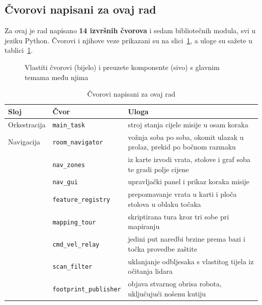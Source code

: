 \documentclass[12pt,a4paper]{article}
\begin{document}
\subsection{Čvorovi napisani za ovaj rad}

Za ovaj je rad napisano \textbf{14 izvršnih čvorova} i sedam bibliotečnih modula, svi u jeziku
Python. Čvorovi i njihove veze prikazani su na slici~\ref{fig:graf}, a uloge su sažete u
tablici~\ref{tab:cvorovi}.

\begin{figure}[!htbp]
    \centering
    \resizebox{0.92\textwidth}{!}{}
    \caption{Vlastiti čvorovi (bijelo) i preuzete komponente (sivo) s glavnim temama među njima}
    \label{fig:graf}
\end{figure}

\begin{table}[!htbp]
    \centering
    \caption{Čvorovi napisani za ovaj rad}
    \label{tab:cvorovi}
    \scriptsize
    \begin{tabularx}{\textwidth}{@{}l l X@{}}
        \toprule
        \textbf{Sloj} & \textbf{Čvor} & \textbf{Uloga} \\
        \midrule
        Orkestracija & \texttt{main\_task}           & stroj stanja cijele misije u osam koraka \\
        \midrule
        Navigacija   & \texttt{room\_navigator}      & vožnja soba po soba, okomit ulazak u prolaz, prekid po bočnom razmaku \\
                     & \texttt{nav\_zones}           & iz karte izvodi vrata, stolove i graf soba te gradi polje cijene \\
                     & \texttt{nav\_gui}             & upravljački panel i prikaz koraka misije \\
                     & \texttt{feature\_registry}    & prepoznavanje vrata u karti i ploča stolova u oblaku točaka \\
                     & \texttt{mapping\_tour}        & skriptirana tura kroz tri sobe pri mapiranju \\
                     & \texttt{cmd\_vel\_relay}      & jedini put naredbi brzine prema bazi i točka provedbe zaštite \\
                     & \texttt{scan\_filter}         & uklanjanje odbljesaka s vlastitog tijela iz očitanja lidara \\
                     & \texttt{footprint\_publisher} & objava stvarnog obrisa robota, uključujući nošenu kutiju \\

\end{tabularx}
\end{table}
\end{document}
